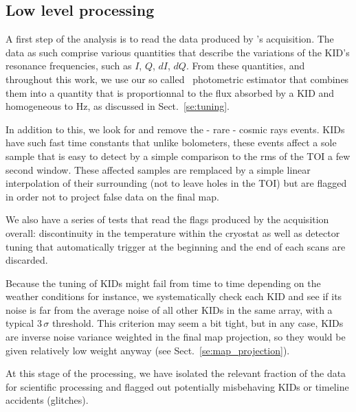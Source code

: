 \subsection{Low level processing}
\label{se:ll_proc}

A first step of the analysis is to read the data produced by \nika's
acquisition. The data as such comprise various quantities that describe the
variations of the KID's resonance frequencies, such as $I$, $Q$, $dI$,
$dQ$. From these quantities, and throughout this work, we use our so called
\rf\ photometric estimator that combines them into a quantity that is
proportionnal to the flux absorbed by a KID \cite{Calvo13} and
homogeneous to Hz, as discussed in Sect.~\ref{se:tuning}.

In addition to this, we look for and remove the - rare - cosmic rays
events. KIDs have such fast time constants that unlike bolometers, these events
affect a sole sample that is easy to detect by a simple comparison to the rms of
the TOI a few second window. These affected samples are remplaced by a simple
linear interpolation of their surrounding (not to leave holes in the TOI) but
are flagged in order not to project false data on the final map.

We also have a series of tests that read the flags produced by the acquisition
overall: discontinuity in the temperature within the cryostat as well
as detector tuning that automatically trigger at the beginning and the
end of each scans are discarded.  

Because the tuning of KIDs might fail from time to time depending on the weather
conditions for instance, we systematically check each KID and see if its noise
is far from the average noise of all other KIDs in the same array, with a
typical $3\,\sigma$ threshold. This criterion may seem a bit tight, but in any case, KIDs
are inverse noise variance weighted in the final map projection, so they would
be given relatively low weight anyway (see Sect.~\ref{se:map_projection}).

At this stage of the processing, we have isolated the relevant fraction of the
data for scientific processing and flagged out potentially misbehaving KIDs or
timeline accidents (glitches).

